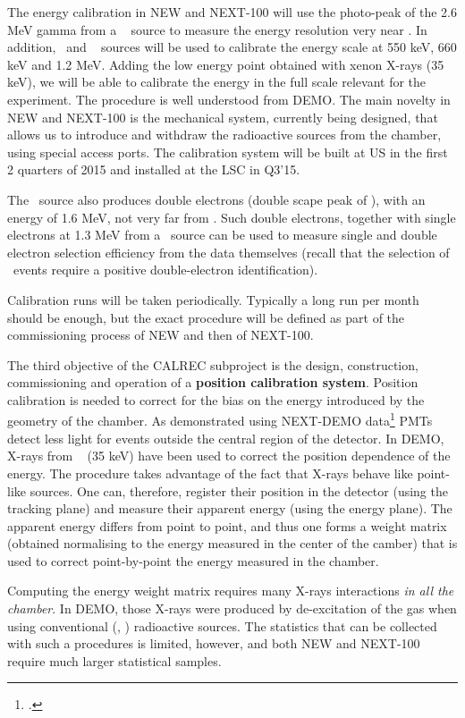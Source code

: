 The energy calibration in NEW and NEXT-100 will use the photo-peak of the 2.6 MeV gamma from a \Tl~  source to measure the energy resolution very near \Qbb. In addition, \NA\ and \CS~ sources will be used to calibrate the energy scale at  550 keV, 660 keV and 1.2 MeV. Adding the low energy point obtained with xenon X-rays (35 keV), we will be able to calibrate the energy in the full scale relevant for the experiment. The procedure is well understood from DEMO. The main novelty in NEW and NEXT-100 is the mechanical system, currently being designed, that allows us to introduce and withdraw the radioactive sources from the chamber, using special access ports. The calibration system will be built at US in the first 2 quarters of 2015 and installed at the LSC in Q3'15.

The \TL\ source also produces double electrons (double scape peak of \TL), with an energy of 1.6 MeV, not very far from \Qbb. Such double electrons, together with single electrons at 1.3 MeV from a \NA\ source can be used to measure single and double electron selection efficiency from the data themselves (recall that the selection of \bb\ events require a positive double-electron identification).

Calibration runs will be taken periodically. Typically a long run per month should be enough, but the exact procedure will be defined as part of the commissioning process of NEW and then of NEXT-100. 

The third objective of the CALREC subproject is the design, construction, commissioning and operation of a {\bf position calibration system}. Position calibration is needed to correct for the bias on the energy introduced by the geometry of the chamber. As demonstrated using NEXT-DEMO data\footcite{Lorca:2014sra} PMTs detect less light for events outside the central region of the detector. In DEMO, X-rays from \Xe ~ (35 keV) have been used to correct the position dependence of the energy. The procedure takes advantage of the fact that X-rays behave like point-like sources. One can, therefore, register their position in the detector (using the tracking plane) and measure their apparent energy (using the energy plane). The apparent energy differs from point to point, and thus one forms a weight matrix  (obtained normalising to the energy measured in the center of the camber) that is used to correct point-by-point the energy measured in the chamber.

Computing the energy weight matrix requires many X-rays interactions {\em in all the chamber}. In DEMO, those X-rays were produced by de-excitation of the gas when using conventional (\NA, \CS) radioactive sources. The statistics that can be collected with such a procedures is limited, however, and both NEW and NEXT-100 require much larger statistical samples.

